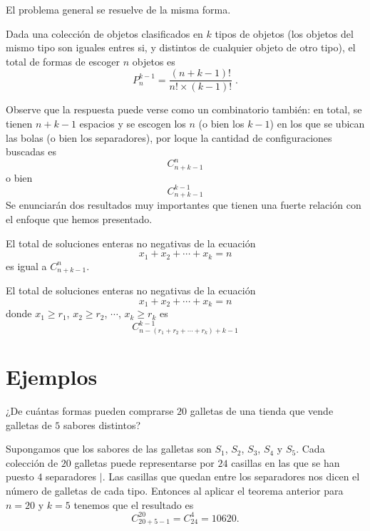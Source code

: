 \documentclass[12pt]{article}
\begin{document}
El problema general se resuelve de la misma forma.
\begin{teorema}\label{teo1}
    Dada una colección de objetos clasificados en $k$ tipos de objetos (los objetos del mismo tipo son iguales entres si, y distintos de cualquier objeto de otro tipo), el total de formas de escoger $n$ objetos es
    \[P^{k-1}_n=\frac{(n+k-1)!}{n!\times (k-1)!}\;.\]
\end{teorema}
Observe que la respuesta puede verse como un combinatorio también: en total, se tienen $n+k-1$ espacios y se escogen los $n$ (o bien los $k-1$) en los que se ubican las bolas (o bien los separadores), por loque la cantidad de configuraciones buscadas es
\[C^n_{n+k-1}\]
o bien
\[C^{k-1}_{n+k-1}\]
Se enunciarán dos resultados muy importantes que tienen una fuerte relación con el enfoque que hemos presentado.
\begin{teorema}\label{teo2}
 El total de soluciones enteras no negativas de la ecuación 
 \[x_1+ x_2+\cdots+x_k=n\]
 es igual a $C^n_{n+k-1}$.
\end{teorema}

\begin{teorema}\label{teo3}
El total de soluciones enteras no negativas de la ecuación 
\[x_1+x_2+\cdots+x_k=n\]
donde $x_1\geq r_1$, $x_2\geq r_2$, $\cdots$, $x_k\geq r_k$ es
\[C^{k-1}_{n-(r_1+r_2+\cdots+r_k)+k-1}\]
\end{teorema}
\section{Ejemplos}
\begin{ejemplo}
¿De cuántas formas pueden comprarse $20$ galletas de una tienda que vende galletas de $5$ sabores distintos?
\end{ejemplo}
\begin{solucion}
Supongamos que los sabores de las galletas son $S_1$, $S_2$, $S_3$, $S_4$ y $S_5$. Cada colección de $20$ galletas puede representarse por $24$ casillas en las que se han puesto $4$ separadores $|$. Las casillas que quedan entre los separadores nos dicen el número de galletas de cada tipo. Entonces al aplicar el teorema anterior para $n=20$ y $k=5$ tenemos que el resultado es
\[C^{20}_{20+5-1}=C^{4}_{24}=10620.\]
\end{solucion}
\end{document}
